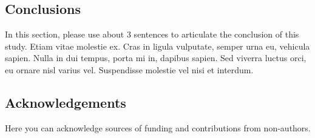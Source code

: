 \documentclass[10pt]{article}
\begin{document}
\begin{multicols}{2}
\section{Conclusions}
In this section, please use about 3 sentences to articulate the conclusion of this study. Etiam vitae molestie ex. Cras in ligula vulputate, semper urna eu, vehicula sapien. Nulla in dui tempus, porta mi in, dapibus sapien. Sed viverra luctus orci, eu ornare nisl varius vel. Suspendisse molestie vel nisi et interdum.


\subsection{Acknowledgements}
\footnotesize
Here you can acknowledge sources of funding and contributions from non-authors.



\end{multicols}
\end{document}

